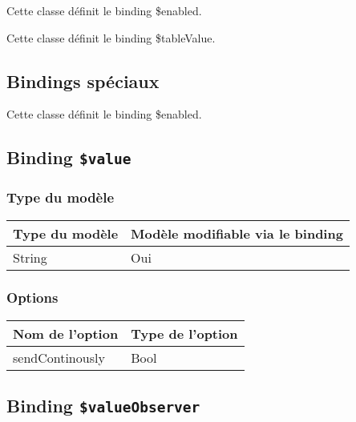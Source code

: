 Cette classe définit le binding \$enabled.

Cette classe définit le binding \$tableValue.









\subsection{Bindings spéciaux}

Cette classe définit le binding \$enabled.

\subsection{Binding \texttt{\$value}}

\subsubsection{Type du modèle}

\begin{tabular}{|l|l|}
\hline
\textbf{Type du modèle} & \textbf{Modèle modifiable via le binding}\\
\hline
String & Oui\\
\hline
\end{tabular}
\subsubsection{Options}

\begin{tabular}{|l|l|}
\hline
\textbf{Nom de l'option} & \textbf{Type de l'option}\\
\hline
sendContinously & Bool\\
\hline
\end{tabular}








\subsection{Binding \texttt{\$valueObserver}}

